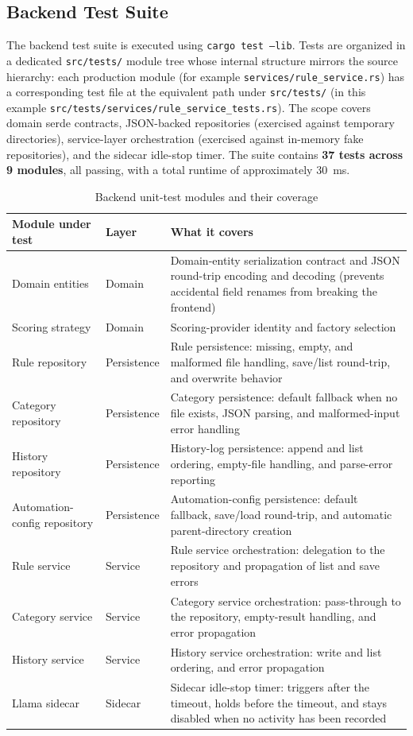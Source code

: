 \documentclass[12pt,oneside,openright,a4paper]{cpe-english-project}
\begin{document}
\subsection{Backend Test Suite}
The backend test suite is executed using \texttt{cargo test --lib}. Tests are organized in a dedicated \texttt{src/tests/} module tree whose internal structure mirrors the source hierarchy: each production module (for example \texttt{services/rule\_service.rs}) has a corresponding test file at the equivalent path under \texttt{src/tests/} (in this example \texttt{src/tests/services/rule\_service\_tests.rs}). The scope covers domain serde contracts, JSON-backed repositories (exercised against temporary directories), service-layer orchestration (exercised against in-memory fake repositories), and the sidecar idle-stop timer. The suite contains \textbf{37 tests across 9 modules}, all passing, with a total runtime of approximately 30~ms.

\begin{table}[H]
\centering
\caption{Backend unit-test modules and their coverage}
\begin{tabular}{|p{}|p{}|p{}|}
\hline
\textbf{Module under test} & \textbf{Layer} & \textbf{What it covers} \\
\hline
Domain entities & Domain & Domain-entity serialization contract and JSON round-trip encoding and decoding (prevents accidental field renames from breaking the frontend) \\
\hline
Scoring strategy & Domain & Scoring-provider identity and factory selection \\
\hline
Rule repository & Persistence & Rule persistence: missing, empty, and malformed file handling, save/list round-trip, and overwrite behavior \\
\hline
Category repository & Persistence & Category persistence: default fallback when no file exists, JSON parsing, and malformed-input error handling \\
\hline
History repository & Persistence & History-log persistence: append and list ordering, empty-file handling, and parse-error reporting \\
\hline
Automation-config repository & Persistence & Automation-config persistence: default fallback, save/load round-trip, and automatic parent-directory creation \\
\hline
Rule service & Service & Rule service orchestration: delegation to the repository and propagation of list and save errors \\
\hline
Category service & Service & Category service orchestration: pass-through to the repository, empty-result handling, and error propagation \\
\hline
History service & Service & History service orchestration: write and list ordering, and error propagation \\
\hline
Llama sidecar & Sidecar & Sidecar idle-stop timer: triggers after the timeout, holds before the timeout, and stays disabled when no activity has been recorded \\
\hline
\end{tabular}
\end{table}
\end{document}
